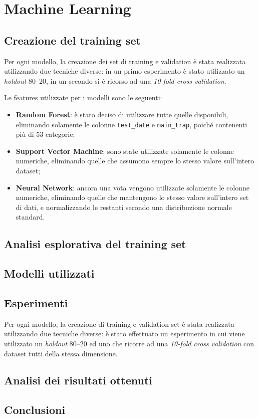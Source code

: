 \setcounter{chapter}{0}
\part{Machine Learning}
\chapter{Creazione del training set}
Per ogni modello, la creazione dei set di training e validation è stata 
realizzata utilizzando due tecniche diverse: in un primo esperimento è stato 
utilizzato un \textit{holdout} 80--20, in un secondo si è ricorso ad una 
\textit{10-fold cross validation}.

Le features utilizzate per i modelli sono le seguenti:
\begin{itemize}
	\item \textbf{Random Forest}: è stato deciso di utilizzare tutte quelle 
	disponibili, eliminando solamente le colonne \texttt{test\_date} e 
	\texttt{main\_trap}, poiché contenenti più di 53 categorie;
	\item \textbf{Support Vector Machine}: sono state utilizzate solamente le 
	colonne numeriche, eliminando quelle che assumono sempre lo stesso 
	valore sull'intero dataset;
	\item \textbf{Neural Network}: ancora una vota vengono utilizzate solamente 
	le colonne numeriche, eliminando quelle che mantengono lo stesso valore 
	sull'intero set di dati, e	normalizzando le restanti secondo una 
	distribuzione normale standard.
\end{itemize} 

\chapter{Analisi esplorativa del training set}

\chapter{Modelli utilizzati}


\chapter{Esperimenti}
Per ogni modello, la creazione di training e validation set è stata realizzata 
utilizzando due tecniche diverse: è stato effettuato un esperimento in cui 
viene utilizzato un \textit{holdout} 80--20 ed uno che ricorre ad una 
\textit{10-fold cross validation} con dataset tutti della stessa dimensione.


\chapter{Analisi dei risultati ottenuti}

\chapter{Conclusioni}
